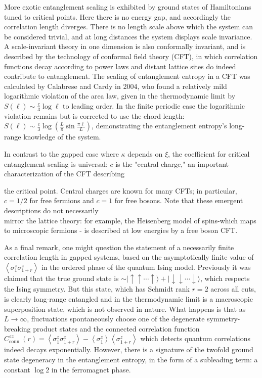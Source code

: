 \documentclass[12pt]{article}
\begin{document}
More exotic entanglement scaling is exhibited by ground states of Hamiltonians tuned to critical points. Here there is no energy gap, and accordingly the correlation length diverges. There is no length scale above which the system can be considered trivial, and at long distances the system displays scale invariance. A scale-invariant theory in one dimension is also conformally invariant, and is described by the technology of conformal field theory (CFT), in which correlation functions decay according to power laws and distant lattice sites do indeed contribute to entanglement. The scaling of entanglement entropy in a CFT was calculated by Calabrese and Cardy in 2004, who found a relatively mild logarithmic violation of the area law, given in the thermodynamic limit by $S(\ell) \sim \frac{c}{3} \log \ell$ to leading order. In the finite periodic case the logarithmic violation remains but is corrected to use the chord length: $S(\ell) \sim \frac{c}{3} \log \left(\frac{L}{\pi} \sin \frac{\pi \ell}{L}\right)$, demonstrating the entanglement entropy's long-range knowledge of the system.

In contrast to the gapped case where $\kappa$ depends on $\xi$, the coefficient for critical entanglement scaling is universal: $c$ is the "central charge," an important characterization of the CFT describing

the critical point. Central charges are known for many CFTs; in particular, $c=1 / 2$ for free fermions and $c=1$ for free bosons. Note that these emergent descriptions do not necessarily\\
mirror the lattice theory: for example, the Heisenberg model of spins-which maps to microscopic fermions - is described at low energies by a free boson CFT.

As a final remark, one might question the statement of a necessarily finite correlation length in gapped systems, based on the asymptotically finite value of $\left\langle\sigma_{1}^{z} \sigma_{1+r}^{z}\right\rangle$ in the ordered phase of the quantum Ising model. Previously it was claimed that the true ground state is $\sim|\uparrow \uparrow \cdots \uparrow\rangle+|\downarrow \downarrow \cdots \downarrow\rangle$, which respects the Ising symmetry. But this state, which has Schmidt rank $r=2$ across all cuts, is clearly long-range entangled and in the thermodynamic limit is a macroscopic superposition state, which is not observed in nature. What happens is that as $L \rightarrow \infty$, fluctuations spontaneously choose one of the degenerate symmetry-breaking product states and the connected correlation function $C_{\text {conn }}^{z z}(r)=\left\langle\sigma_{1}^{z} \sigma_{1+r}^{z}\right\rangle-\left\langle\sigma_{1}^{z}\right\rangle\left\langle\sigma_{1+r}^{z}\right\rangle$ which detects quantum correlations indeed decays exponentially. However, there is a signature of the twofold ground state degeneracy in the entanglement entropy, in the form of a subleading term: a constant $\log 2$ in the ferromagnet phase.
\end{document}
